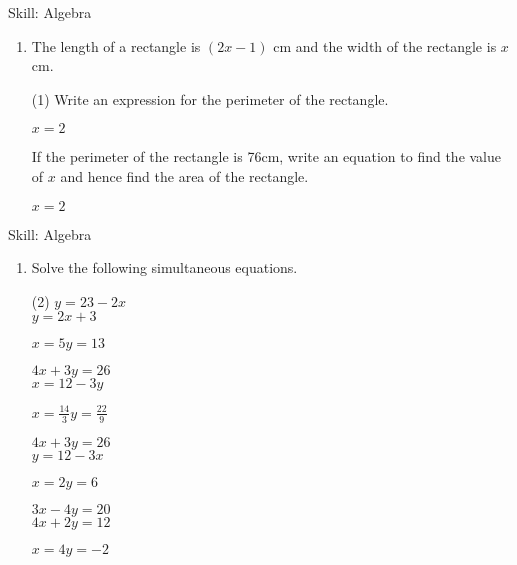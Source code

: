 \begin{bxTip}[colbacktitle=green]{Skill: Algebra}

\begin{enumerate} [leftmargin=0cm] 

\item The length of a rectangle is $(2x-1)$ cm and the width of the rectangle is $x$ cm.
\begin{tasks}[label=(\alph*), after-item-skip=2pt,after-skip=3pt, label-width=4ex](1)
    \task  Write an expression for the perimeter of the rectangle.	           
	              \begin{envAnswer}[blankline=3]         $      x=2         $ \end{envAnswer}
	\task  If the perimeter of the rectangle is 76cm, write an equation to find the value of $x$ and
hence find the area of the rectangle.               \begin{envAnswer}[blankline=3]         $      x=2         $ \end{envAnswer}
\end{tasks}


\end{enumerate}

\end{bxTip}




\begin{bxTip}[colbacktitle=green]{Skill: Algebra}

\begin{enumerate} [leftmargin=0cm] 

\item Solve the following simultaneous equations.
\begin{tasks}[label=(\alph*), after-item-skip=2pt,after-skip=3pt, label-width=4ex](2)
    \task  $y = 23-2x$\\
           $y = 2x+3$	
	              \begin{envAnswer}[blankline=6]         $      x=5 y=13         $ \end{envAnswer}
    \task  $4x + 3y = 26$\\
           $x = 12-3y$	
	              \begin{envAnswer}[blankline=6]         $      x=\frac{14}{3}  y=\frac{22}{9}         $ \end{envAnswer}
    \task  $4x + 3y = 26$\\
           $y = 12-3x$	
	              \begin{envAnswer}[blankline=6]         $      x=2   y=6      $ \end{envAnswer}
    \task  $3x-4y = 20$\\
           $4x + 2y = 12$	
	              \begin{envAnswer}[blankline=6]         $      x=4   y=-2         $ \end{envAnswer}

\end{tasks}


\end{enumerate}

\end{bxTip}



